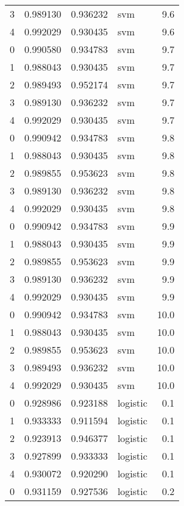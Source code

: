 \begin{tabular}{rrrlr}
     3 & 0.989130 & 0.936232 &      svm &        9.6 \\
     4 & 0.992029 & 0.930435 &      svm &        9.6 \\
     0 & 0.990580 & 0.934783 &      svm &        9.7 \\
     1 & 0.988043 & 0.930435 &      svm &        9.7 \\
     2 & 0.989493 & 0.952174 &      svm &        9.7 \\
     3 & 0.989130 & 0.936232 &      svm &        9.7 \\
     4 & 0.992029 & 0.930435 &      svm &        9.7 \\
     0 & 0.990942 & 0.934783 &      svm &        9.8 \\
     1 & 0.988043 & 0.930435 &      svm &        9.8 \\
     2 & 0.989855 & 0.953623 &      svm &        9.8 \\
     3 & 0.989130 & 0.936232 &      svm &        9.8 \\
     4 & 0.992029 & 0.930435 &      svm &        9.8 \\
     0 & 0.990942 & 0.934783 &      svm &        9.9 \\
     1 & 0.988043 & 0.930435 &      svm &        9.9 \\
     2 & 0.989855 & 0.953623 &      svm &        9.9 \\
     3 & 0.989130 & 0.936232 &      svm &        9.9 \\
     4 & 0.992029 & 0.930435 &      svm &        9.9 \\
     0 & 0.990942 & 0.934783 &      svm &       10.0 \\
     1 & 0.988043 & 0.930435 &      svm &       10.0 \\
     2 & 0.989855 & 0.953623 &      svm &       10.0 \\
     3 & 0.989493 & 0.936232 &      svm &       10.0 \\
     4 & 0.992029 & 0.930435 &      svm &       10.0 \\
     0 & 0.928986 & 0.923188 & logistic &        0.1 \\
     1 & 0.933333 & 0.911594 & logistic &        0.1 \\
     2 & 0.923913 & 0.946377 & logistic &        0.1 \\
     3 & 0.927899 & 0.933333 & logistic &        0.1 \\
     4 & 0.930072 & 0.920290 & logistic &        0.1 \\
     0 & 0.931159 & 0.927536 & logistic &        0.2 \\

\end{tabular}
